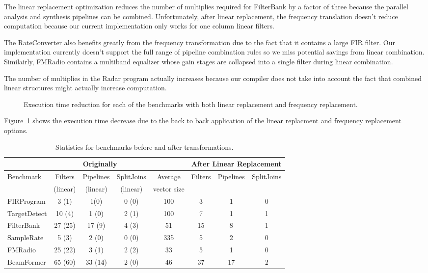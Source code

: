 The linear replacement optimization reduces the number of multiplies 
required for FilterBank by a factor of three because the parallel analysis and 
synthesis pipelines can be combined. Unfortunately, after
linear replacement, the frequency translation doesn't reduce computation 
because our current implementation only works for one column linear filters.

The RateConverter also benefits greatly from the frequency
transformation due to the fact that it contains a large FIR
filter. Our implementation currently doesn't support the full range of
pipeline combination rules so we miss potential savings from linear
combination. Similairly, FMRadio contains a multiband equalizer whose gain stages are collapsed
into a single filter during linear combination.

The number of multiplies in the Radar program actually increases because our 
compiler does not take into account the fact that combined linear structures 
might actually increase computation. %

\begin{figure}
\center
\epsfxsize=3.2in
\vspace{-6pt}
\caption{Execution time reduction for each of the benchmarks with both linear replacement and frequency replacement.}
\label{fig:execution-speedup}
\vspace{-12pt}
\end{figure}

Figure~\ref{fig:execution-speedup} shows the execution time decrease due to the back to back
application of the linear replacment and frequency replacement options.


\begin{table*}[t]
\centering
\small
\begin{tabular}{|l|c|c|c||c||c|c|c|} 
\hline
          & \multicolumn{3}{|c||}{Originally}  &             & \multicolumn{3}{|c|}{After Linear Replacement} \\
\hline
Benchmark & Filters & Pipelines & SplitJoins & Average     & Filters      & Pipelines         & SplitJoins \\
          & (linear)& (linear)  & (linear)   & vector size &              &                   &            \\
\hline
FIRProgram & 3 (1) & 1(0) & 0 (0) & 100 & 3 & 1 & 0 \\
\hline
TargetDetect & 10 (4) & 1 (0) & 2 (1) & 100 & 7 & 1 & 1 \\
\hline
FilterBank & 27 (25) & 17 (9) & 4 (3) & 51 & 15 & 8 & 1 \\
\hline
SampleRate & 5 (3) & 2 (0) & 0 (0) & 335 & 5 & 2 & 0 \\
\hline
FMRadio & 25 (22) & 3 (1) & 2 (2) & 33 & 5 & 1 & 0 \\
\hline
BeamFormer & 65 (60) & 33 (14) & 2 (0) & 46 & 37 & 17 & 2\\
\hline
\end{tabular}
\caption{Statistics for benchmarks before and after transformations.}
\label{fig:benchmark-stastics}
\end{table*}
